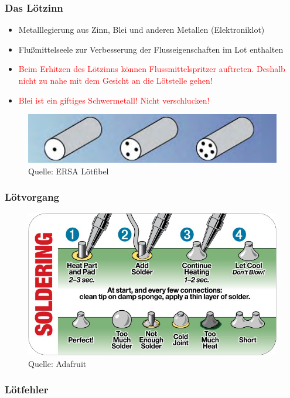 \documentclass[10pt]{beamer}
\begin{document}
	\begin{frame}
	\frametitle{Das Lötzinn}
	\begin{itemize}
		\item{Metalllegierung aus Zinn, Blei und anderen Metallen (Elektroniklot)}
		\item{Flußmittelseele zur Verbesserung der Flusseigenschaften im Lot enthalten}
		\item{\textcolor{red}{Beim Erhitzen des Lötzinns können Flussmittelspritzer auftreten. Deshalb nicht zu nahe mit dem Gesicht an die Lötstelle gehen!}}
		\item{\textcolor{red}{Blei ist ein giftiges Schwermetall! Nicht verschlucken!}}
	\end{itemize}
	\begin{figure}[hbtp]
		\centering
		\includegraphics[width=\linewidth]{images/lotseele.png}
		\caption{Quelle: ERSA Lötfibel}
	\end{figure}
	\end{frame}

	\begin{frame}
	\frametitle{Lötvorgang}
	\begin{figure}[hbtp]
		\centering
		\includegraphics[width=\linewidth]{images/solder.png}
		\caption{Quelle: Adafruit}
	\end{figure}
	\end{frame}

	\begin{frame}
		\frametitle{Lötfehler}
	\end{frame}
\end{document}
